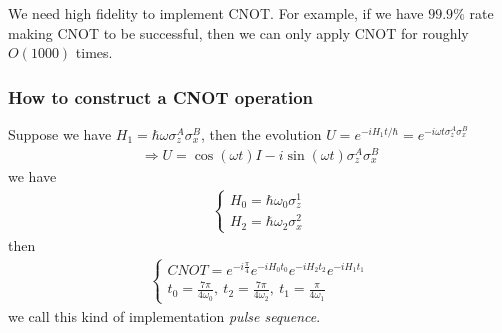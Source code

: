 \documentclass[UTF8,12pt]{article} %
\begin{document}
We need high fidelity to implement CNOT. For example, if we have $99.9\%$ rate making CNOT to be successful, then we can only apply CNOT for roughly $O(1000)$ times.

\subsubsection{How to construct a CNOT operation}
Suppose we have $H_1 =\hbar\omega\sigma_z^A\sigma_x^B$, then the evolution $U = e^{-iH_{1}t/\hbar} = e^{-i\omega t\sigma_{z}^{A}\sigma_{x}^{B}}$
\begin{align}
\Rightarrow U = \cos(\omega t)I - i\sin(\omega t)\sigma_{z}^{A}\sigma_{x}^{B}
\end{align}
we have
\begin{align}
\begin{cases}H_{0} = \hbar\omega_{0}\sigma_{z}^{1}\\H_{2} = \hbar\omega_{2}\sigma_{x}^{2}\end{cases}
\end{align}
then
\begin{align}
\begin{cases}CNOT = e^{-i\frac{\pi}{4}} e^{-iH_{0}t_{0}} e^{-iH_{2}t_{2}} e^{-iH_{1}t_{1}} \\t_{0} = \frac{7\pi}{4\omega_{0}},~t_{2} = \frac{7\pi}{4\omega_{2}},~t_{1} = \frac{\pi}{4\omega_{1}}\end{cases}
\end{align}
we call this kind of implementation \textit{pulse sequence}.
\end{document}
